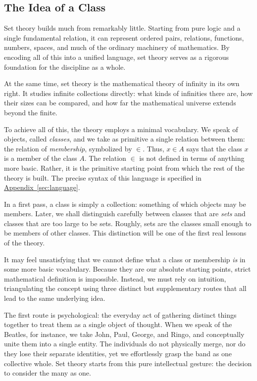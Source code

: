 
\subsection{The Idea of a Class}

Set theory builds much from remarkably little. Starting from pure logic and a single fundamental relation, it can represent ordered pairs, relations, functions, numbers, spaces, and much of the ordinary machinery of mathematics. By encoding all of this into a unified language, set theory serves as a rigorous foundation for the discipline as a whole.

At the same time, set theory is the mathematical theory of infinity in its own right. It studies infinite collections directly: what kinds of infinities there are, how their sizes can be compared, and how far the mathematical universe extends beyond the finite.

To achieve all of this, the theory employs a minimal vocabulary. We speak of objects, called \textit{classes}, and we take as primitive a single relation between them: the relation of \textit{membership}, symbolized by $\in$. Thus, $x \in A$ says that the class $x$ is a member of the class $A$. The relation $\in$ is not defined in terms of anything more basic. Rather, it is the primitive starting point from which the rest of the theory is built. The precise syntax of this language is specified in \underline{\hyperref[sec:language]{Appendix~\ref*{sec:language}}}.

In a first pass, a class is simply a collection: something of which objects may be members. Later, we shall distinguish carefully between classes that are \textit{sets} and classes that are too large to be sets. Roughly, sets are the classes small enough to be members of other classes. This distinction will be one of the first real lessons of the theory.

It may feel unsatisfying that we cannot define what a class or membership \textit{is} in some more basic vocabulary. Because they are our absolute starting points, strict mathematical definition is impossible. Instead, we must rely on intuition, triangulating the concept using three distinct but supplementary routes that all lead to the same underlying idea.

The first route is psychological: the everyday act of gathering distinct things together to treat them as a single object of thought. When we speak of the Beatles, for instance, we take John, Paul, George, and Ringo, and conceptually unite them into a single entity. The individuals do not physically merge, nor do they lose their separate identities, yet we effortlessly grasp the band as one collective whole. Set theory starts from this pure intellectual gesture: the decision to consider the many as one.

